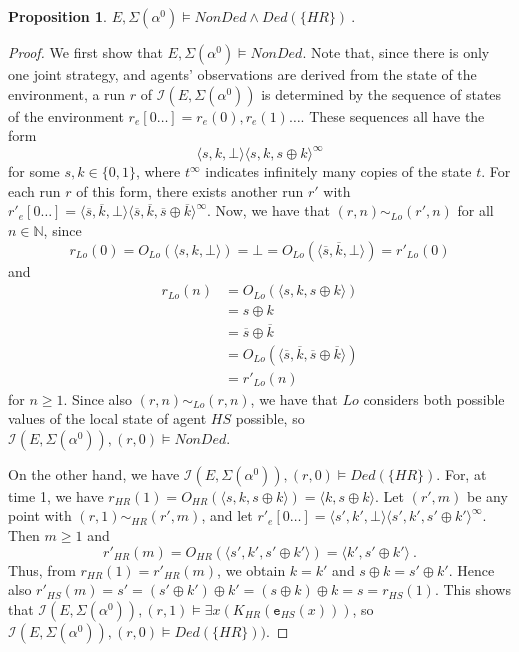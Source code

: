 \documentclass[a4wide]{article}
\newcommand{\nat}{\mathbb{N}}
\newtheorem{propn}{Proposition}
\theoremstyle{examplesty}
\newcommand{\I}{\mathcal{I}}
\newcommand{\lid}[2]{\mathtt{e}_{#1}(#2)}
\newcommand{\Env}{E}
\newcommand{\Low}{Lo}
\begin{document}
\begin{propn} \label{prop:nonded} 
$\Env, \Sigma(\alpha^0) \models \mathit{NonDed} \land \mathit{Ded}(\{HR\})~.$ 
\end{propn} 
\begin{proof} 
We first show that $E, \Sigma(\alpha^0) \models \mathit{NonDed}$. 
Note that, since there is only one joint strategy, and agents' observations are derived from the 
state of the environment, a run $r$ of $\I(\Env, \Sigma(\alpha^0))$ is determined by the
sequence of states of the  environment $r_e[0\ldots] =  r_e(0),r_e(1) \ldots$. These sequences 
all have the form 
$$\langle s,k,\bot\rangle \langle s,k,s\oplus k\rangle^\infty$$ 
for some $s,k \in \{0,1\}$, where $t^\infty$ indicates infinitely many copies of the state $t$. 
For each run $r$ of this form, there exists another run $r'$ with 
$r'_e[0\ldots] = \langle \overline{s},\overline{k},\bot\rangle \langle \overline{s},\overline{k},\overline{s}\oplus \overline{k}\rangle^\infty$.
Now, we have that $(r,n) \sim_{\Low} (r',n)$ for all $n \in \nat$, since 
$$r_{\Low}(0)  = O_{\Low}(\langle s,k,\bot\rangle )  =  \bot = O_{\Low}(\langle \overline{s},\overline{k},\bot\rangle )  = r'_{\Low}(0)$$
and  
\begin{align*} 
r_{\Low}(n) &  = O_{\Low}(\langle s,k,s\oplus k \rangle )\\
&  =  s\oplus k \\
& =  \overline{s}\oplus \overline{k} \\
& = O_{\Low}(\langle \overline{s},\overline{k},\overline{s} \oplus \overline{k}\rangle ) \\
& =  r'_{\Low}(n)
\end{align*}  
for $n \geq 1$. 
Since also $(r,n) \sim_{\Low}(r,n)$, we have that $\Low$ considers both possible values of the local state of agent $HS$ possible, 
so $\I(\Env, \Sigma(\alpha^0)),(r,0) \models  \mathit{NonDed}$. 


On the other hand, we have  $\I(\Env, \Sigma(\alpha^0)),(r,0) \models  \mathit{Ded}(\{HR\})$. For,  at time 1, we
have $r_ {HR}(1) = O_{HR}(\langle s, k, s\oplus k\rangle) = \langle k, s\oplus k\rangle $. 
Let $(r',m)$ be any point with $(r,1) \sim_{HR} (r',m)$, and let
$r'_e[0\ldots] = \langle s',k',\bot\rangle \langle s',k',s'\oplus k'\rangle^\infty$. Then $m \geq 1$ and 
$$r'_{HR}(m) =  O_{HR}(\langle s', k', s'\oplus k'\rangle) = \langle k', s'\oplus k' \rangle~.$$ 
Thus, from $r_{HR}(1) = r'_{HR}(m)$, we obtain 
$k = k'$ and $s\oplus k = s' \oplus k'$. Hence also 
 $ r'_{HS}(m) = s' =
 (s'\oplus k')\oplus k' = (s\oplus k)\oplus k = s =  r_{HS}(1) $. 
This shows that  $\I(\Env, \Sigma(\alpha^0)),(r,1)\models  \exists x( K_{HR} ( \lid{HS}{x}))$, 
so $\I(\Env, \Sigma(\alpha^0)),(r,0)\models  \mathit{Ded}(\{HR\}))$. 
\end{proof} 
\end{document}
